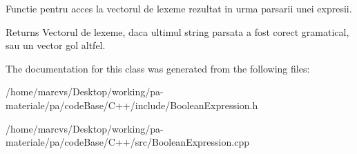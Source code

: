 Functie pentru acces la vectorul de lexeme rezultat in urma parsarii unei expresii. 

\begin{DoxyReturn}{Returns}
Vectorul de lexeme, daca ultimul string parsata a fost corect gramatical, sau un vector gol altfel. 
\end{DoxyReturn}


The documentation for this class was generated from the following files:\begin{DoxyCompactItemize}
\item 
/home/marcvs/Desktop/working/pa-\/materiale/pa/codeBase/C++/include/BooleanExpression.h\item 
/home/marcvs/Desktop/working/pa-\/materiale/pa/codeBase/C++/src/BooleanExpression.cpp\end{DoxyCompactItemize}
